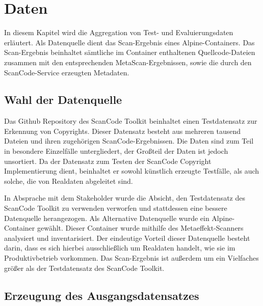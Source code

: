 \chapter{Daten}\label{ch:daten}

In diesem Kapitel wird die Aggregation von Test- und Evaluierungsdaten erläutert.
Als Datenquelle dient das Scan-Ergebnis eines Alpine-Containers.
Das Scan-Ergebnis beinhaltet sämtliche im Container enthaltenen Quellcode-Dateien zusammen mit den entsprechenden MetaScan-Ergebnissen, sowie die durch den ScanCode-Service erzeugten Metadaten.

\section{Wahl der Datenquelle}\label{sec:wahl-der-datenquelle}

Das Github Repository des ScanCode Toolkit beinhaltet einen Testdatensatz zur Erkennung von Copyrights.
Dieser Datensatz besteht aus mehreren tausend Dateien und ihren zugehörigen ScanCode-Ergebnissen.
Die Daten sind zum Teil in besondere Einzelfälle untergliedert, der Großteil der Daten ist jedoch unsortiert.
Da der Datensatz zum Testen der ScanCode Copyright Implementierung dient, beinhaltet er sowohl künstlich erzeugte Testfälle, als auch solche, die von Realdaten abgeleitet sind.

In Absprache mit dem Stakeholder wurde die Absicht, den Testdatensatz des ScanCode Toolkit zu verwenden verworfen und stattdessen eine bessere Datenquelle herangezogen.
Als Alternative Datenquelle wurde ein Alpine-Container gewählt.
Dieser Container wurde mithilfe des Metaeffekt-Scanners analysiert und inventarisiert.
Der eindeutige Vorteil dieser Datenquelle besteht darin, dass es sich hierbei ausschließlich um Realdaten handelt, wie sie im Produktivbetrieb vorkommen.
Das Scan-Ergebnis ist außerdem um ein Vielfaches größer als der Testdatensatz des ScanCode Toolkit.

\section{Erzeugung des Ausgangsdatensatzes}\label{sec:erzeugung-datensatz}

